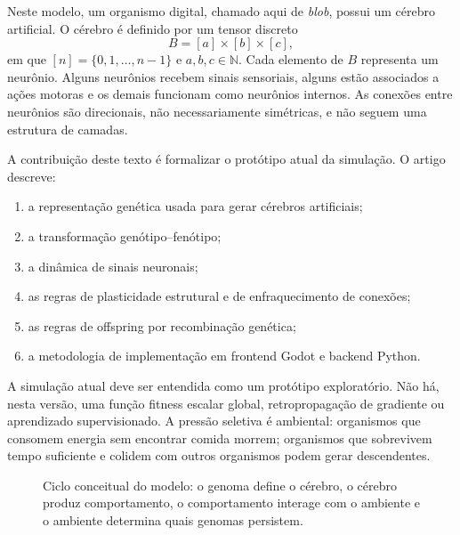 \documentclass[12pt,a4paper,fleqn]{article}
\newcommand{\N}{\mathbb{N}}
\begin{document}
Neste modelo, um organismo digital, chamado aqui de \emph{blob}, possui um cérebro artificial. O cérebro é definido por um tensor discreto
$$
	B = [a] \times [b] \times [c],
$$
em que $[n]=\{0,1,\ldots,n-1\}$ e $a,b,c \in \N$. Cada elemento de $B$ representa um neurônio. Alguns neurônios recebem sinais sensoriais, alguns estão associados a ações motoras e os demais funcionam como neurônios internos. As conexões entre neurônios são direcionais, não necessariamente simétricas, e não seguem uma estrutura de camadas.

A contribuição deste texto é formalizar o protótipo atual da simulação. O artigo descreve:

\begin{enumerate}
	\item a representação genética usada para gerar cérebros artificiais;
	\item a transformação genótipo--fenótipo;
	\item a dinâmica de sinais neuronais;
	\item as regras de plasticidade estrutural e de enfraquecimento de conexões;
	\item as regras de offspring por recombinação genética;
	\item a metodologia de implementação em frontend Godot e backend Python.
\end{enumerate}

A simulação atual deve ser entendida como um protótipo exploratório. Não há, nesta versão, uma função fitness escalar global, retropropagação de gradiente ou aprendizado supervisionado. A pressão seletiva é ambiental: organismos que consomem energia sem encontrar comida morrem; organismos que sobrevivem tempo suficiente e colidem com outros organismos podem gerar descendentes.

\begin{figure}[H]
\centering
{}
\caption{Ciclo conceitual do modelo: o genoma define o cérebro, o cérebro produz comportamento, o comportamento interage com o ambiente e o ambiente determina quais genomas persistem.}
\label{fig:ciclo-conceitual}
\end{figure}
\end{document}
